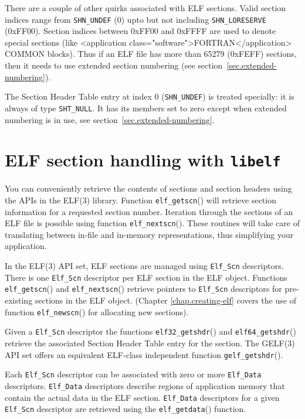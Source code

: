 \documentclass[a4paper]{book}
\newcommand{\constant}[1]{\texttt{#1}}
\newcommand{\function}[1]{\texttt{#1}()}
\newcommand{\library}[1]{\texttt{#1}}
\newcommand{\type}[1]{\texttt{#1}}
\begin{document}
There are a couple of other quirks associated with ELF sections. Valid
section indices range from \constant{SHN\_UNDEF} (0) upto but not
including \constant{SHN\_LORESERVE} (0xFF00).  Section indices between
0xFF00 and 0xFFFF are used to denote special sections (like
<application class="software">FORTRAN</application> COMMON blocks).
Thus if an ELF file has more than 65279 (0xFEFF) sections, then it
needs to use extended section numbering (see
section~\vref{sec.extended-numbering}).

The Section Header Table entry at index 0 (\constant{SHN\_UNDEF}) is
treated specially: it is always of type \constant{SHT\_NULL}.  It has
its members set to zero except when extended numbering is in use, see
section~\vref{sec.extended-numbering}.

\section{ELF section handling with \library{libelf}}

You can conveniently retrieve the contents of sections and section
headers using the APIs in the ELF(3) library.  Function
\function{elf\_getscn} will retrieve section information for a
requested section number.  Iteration through the sections of an ELF
file is possible using function \function{elf\_nextscn}.  These
routines will take care of translating between in-file and in-memory
representations, thus simplifying your application.

In the ELF(3) API set, ELF sections are managed using \type{Elf\_Scn}
descriptors.  There is one \type{Elf\_Scn} descriptor per ELF section
in the ELF object.  Functions \function{elf\_getscn} and
\function{elf\_nextscn} retrieve pointers to \type{Elf\_Scn}
descriptors for pre-existing sections in the ELF object.  (Chapter
\vref{chap.creating-elf} covers the use of function
\function{elf\_newscn} for allocating new sections).

Given a \type{Elf\_Scn} descriptor the functions
\function{elf32\_getshdr} and \function{elf64\_getshdr} retrieve the
associated Section Header Table entry for the section.  The GELF(3)
API set offers an equivalent ELF-class independent function
\function{gelf\_getshdr}.

Each \type{Elf\_Scn} descriptor can be associated with zero or more
\type{Elf\_Data} descriptors.  \type{Elf\_Data} descriptors describe
regions of application memory that contain the actual data in the ELF
section.  \type{Elf\_Data} descriptors for a given \type{Elf\_Scn}
descriptor are retrieved using the \function{elf\_getdata} function.
\end{document}
